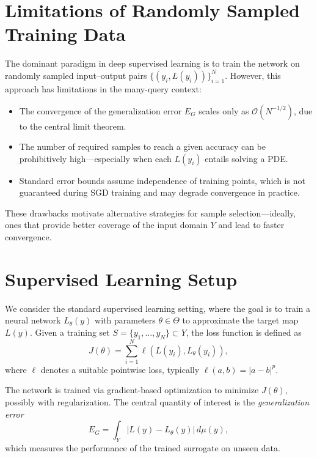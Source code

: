 \section{Limitations of Randomly Sampled Training Data}

The dominant paradigm in deep supervised learning is to train the network on randomly sampled input–output pairs $\{(y_i, L(y_i))\}_{i=1}^N$. However, this approach has limitations in the many-query context:

\begin{itemize}
    \item The convergence of the generalization error $E_G$ scales only as $\mathcal{O}(N^{-1/2})$, due to the central limit theorem.
    \item The number of required samples to reach a given accuracy can be prohibitively high—especially when each $L(y_i)$ entails solving a PDE.
    \item Standard error bounds assume independence of training points, which is not guaranteed during SGD training and may degrade convergence in practice.
\end{itemize}

These drawbacks motivate alternative strategies for sample selection—ideally, ones that provide better coverage of the input domain $Y$ and lead to faster convergence.

\section{Supervised Learning Setup}

We consider the standard supervised learning setting, where the goal is to train a neural network $L_\theta(y)$ with parameters $\theta \in \Theta$ to approximate the target map $L(y)$. Given a training set $S = \{y_1, \dots, y_N\} \subset Y$, the loss function is defined as
\[
J(\theta) = \sum_{i=1}^N \ell\left(L(y_i), L_\theta(y_i)\right),
\]
where $\ell$ denotes a suitable pointwise loss, typically $\ell(a, b) = |a - b|^p$.

The network is trained via gradient-based optimization to minimize $J(\theta)$, possibly with regularization. The central quantity of interest is the \emph{generalization error}
\[
E_G = \int_Y |L(y) - L_\theta(y)| \, d\mu(y),
\]
which measures the performance of the trained surrogate on unseen data.

